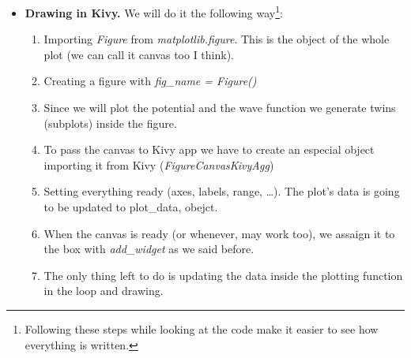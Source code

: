 \documentclass{article}
\begin{document}
\begin{itemize}
	Moving now to the kivy file, the name of the first class has to appear like this: \textit{$<$1st\_class\_name$>$}. Below it, using indentation\footnote{Identation used always when defining something inside an object, like a button, a box, a grid, etc.}, we introduce all the elements of the app. Each element can have an id and the properties of the element can be used and changed in the python file using its \textit{name of functions used like name.func (can't remember the name right now)}. So if we want to now the value of some slider we'll do: \textit{slider\_id.value()}.\\
	This is the general structure of any Kivy app. Now we want to animate a plot\footnote{See next point for the plotting object.}. This we will do by first assigning the canvas to some box with \textit{box\_id.add\_widget(canvas\_name)}. Then using the module Clock from Kivy, the function \textit{Clock.schedule\_interval(function, interval)} calls the function after the 'interval' time has passed (in seconds). This two lines, along with several definitions and starting computations, will be written inside the function \textit{\_\_init\_\_}, which is executed when calling the class (since its returned by the second main class, which again is executed when the file is, the class will be called when the file is executed).
	In our case, the called function in the loop is the plot of $\psi (t)$. So the function will compute the value of $\psi (t)$ and drawing it. To do the first, the already written functions like eigenparam and comp will have to be executed before starting the loop, or every time the potential changes (for both functions) or the initial wave function changes (this only affect the comp function). Drawing is explained in the next point.
	
	\item \textbf{Drawing in Kivy.} We will do it the following way\footnote{Following these steps while looking at the code make it easier to see how everything is written.}:
	\begin{enumerate}
		\item Importing \textit{Figure} from \textit{matplotlib.figure}. This is the object of the whole plot (we can call it canvas too I think).
		\item Creating a figure with \textit{fig\_name = Figure()} 
		\item Since we will plot the potential and the wave function we generate twins (subplots) inside the figure.
		\item To pass the canvas to Kivy app we have to create an especial object importing it from Kivy (\textit{FigureCanvasKivyAgg})
		\item Setting everything ready (axes, labels, range, \dots). The plot's data is going to be updated to plot\_data, obejct.
		\item When the canvas is ready (or whenever, may work too), we assaign it to the box with \textit{add\_widget} as we said before.
		\item The only thing left to do is updating the data inside the plotting function in the loop and drawing.
	\end{enumerate}


\end{itemize}
\end{document}
